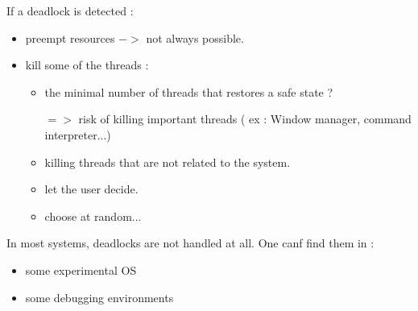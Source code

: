 \documentclass[a4paper,10pt]{article}
\begin{document}
If a deadlock is detected :
\begin{itemize}
  \item preempt resources $->$ not always possible.
  \item kill some of the threads :
  \begin{itemize}
    \item the minimal number of threads that restores a safe state ?

$=>$ risk of killing important threads ( ex : Window manager, command interpreter...)
    \item killing threads that are not related to the system.
    \item let the user decide.
    \item choose at random...
  \end{itemize}
\end{itemize}

In most systems, deadlocks are not handled at all.
One canf find them in :
\begin{itemize}
  \item some experimental OS
  \item some debugging environments
\end{itemize}
\end{document}
